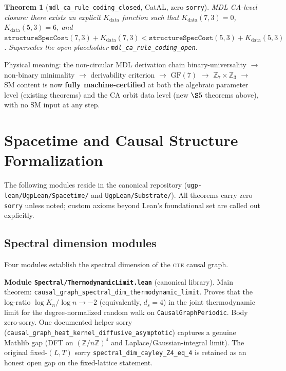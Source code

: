 \documentclass[11pt,a4paper]{article}
\newenvironment{keybox}[1]{%
  \Needspace*{8\baselineskip}%
  \begin{tcolorbox}[
    enhanced,
    breakable=false,
    colback=blue!5,
    colframe=blue!45!black,
    coltitle=black,
    colbacktitle=blue!14,
    boxrule=0.85pt,
    arc=2.5pt,
    left=9pt, right=9pt, top=6pt, bottom=6pt,
    titlerule=0.55pt,
    fonttitle=\bfseries,
    title={#1},
    before upper=\raggedright,
    before skip=0.9\baselineskip,
    after skip=0.9\baselineskip
  ]%
}{%
  \end{tcolorbox}%
}
\newtheorem{theorem}{Theorem}[section]
\theoremstyle{definition}
\newcommand{\gte}{\textsc{gte}}
\begin{document}
\begin{theorem}[\lstinline|mdl_ca_rule_coding_closed|, CatAL, zero \texttt{sorry}]
MDL CA-level closure: there exists an explicit $K_{\mathrm{data}}$
function such that $K_{\mathrm{data}}(7,3)=0$, $K_{\mathrm{data}}(5,3)=6$, and
$\mathtt{structureSpecCost}(7,3)+K_{\mathrm{data}}(7,3) <
\mathtt{structureSpecCost}(5,3)+K_{\mathrm{data}}(5,3)$.
Supersedes the open placeholder \lstinline|mdl_ca_rule_coding_open|.
\end{theorem}

Physical meaning: the non-circular MDL derivation chain
binary-universality $\to$ non-binary minimality $\to$ derivability criterion
$\to$ $\mathrm{GF}(7)$ $\to$ $\mathbb{Z}_7\times\mathbb{Z}_3$ $\to$ SM content
is now \textbf{fully machine-certified} at both the algebraic parameter level (existing
theorems) and the CA orbit data level (new $\S5$ theorems above), with no SM input
at any step.

\section{Spacetime and Causal Structure Formalization}\label{sec:spacetime}

The following modules reside in the canonical repository
(\texttt{ugp-lean/UgpLean/Spacetime/} and \texttt{UgpLean/Substrate/}).
All theorems carry zero \texttt{sorry} unless
noted; custom axioms beyond Lean's foundational set are called out
explicitly.

\subsection{Spectral dimension modules}\label{subsec:spectral-dim}

Four modules establish the spectral dimension of the \gte{} causal graph.

\begin{keybox}{Headline result: $d_s = 4$ in the thermodynamic limit}
\textbf{Module \texttt{Spectral/ThermodynamicLimit.lean}} (canonical library).
Main theorem: \lstinline|causal_graph_spectral_dim_thermodynamic_limit|.
Proves that the log-ratio $\log K_n / \log n \to -2$ (equivalently,
$d_s = 4$) in the joint thermodynamic limit for the degree-normalized
random walk on \lstinline|CausalGraphPeriodic|.  Body zero-sorry.
One documented helper sorry
(\lstinline|causal_graph_heat_kernel_diffusive_asymptotic|) captures a
genuine Mathlib gap (DFT on $(\mathbb{Z}/n\mathbb{Z})^4$ and
Laplace/Gaussian-integral limit).  The original fixed-$(L,T)$ sorry
\lstinline|spectral_dim_cayley_Z4_eq_4| is retained as an honest
open gap on the fixed-lattice statement.
\end{keybox}
\end{document}
